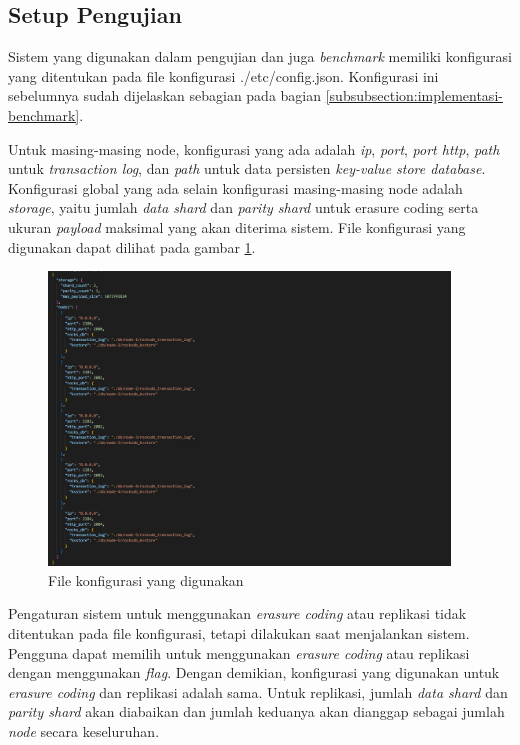 \subsection{Setup Pengujian}
\label{subsection:setup-pengujian}

Sistem yang digunakan dalam pengujian dan juga \textit{benchmark} memiliki konfigurasi yang ditentukan pada file konfigurasi ./etc/config.json. Konfigurasi ini sebelumnya sudah dijelaskan sebagian pada bagian \ref{subsubsection:implementasi-benchmark}.

Untuk masing-masing node, konfigurasi yang ada adalah \textit{ip}, \textit{port}, \textit{port http}, \textit{path} untuk \textit{transaction log}, dan \textit{path} untuk data persisten \textit{key-value store database}. Konfigurasi global yang ada selain konfigurasi masing-masing node adalah \textit{storage}, yaitu jumlah \textit{data shard} dan \textit{parity shard} untuk erasure coding serta ukuran \textit{payload} maksimal yang akan diterima sistem. File konfigurasi yang digunakan dapat dilihat pada gambar \ref{fig:config-json}.

\begin{figure}[ht]
    \centering
    \includegraphics[width=0.95\textwidth]{resources/chapter-4/konfigurasi.png}
    \caption{File konfigurasi yang digunakan}
    \label{fig:config-json}
\end{figure}

Pengaturan sistem untuk menggunakan \textit{erasure coding} atau replikasi tidak ditentukan pada file konfigurasi, tetapi dilakukan saat menjalankan sistem. Pengguna dapat memilih untuk menggunakan \textit{erasure coding} atau
replikasi dengan menggunakan \textit{flag}. Dengan demikian, konfigurasi yang digunakan untuk \textit{erasure coding} dan replikasi adalah sama. Untuk replikasi, jumlah \textit{data shard} dan \textit{parity shard} akan diabaikan dan jumlah keduanya akan dianggap sebagai jumlah \textit{node} secara keseluruhan.

